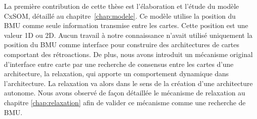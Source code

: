La première contribution de cette thèse est l'élaboration et l'étude du modèle CxSOM, détaillé au chapitre~\ref{chap:modele}.
Ce modèle utilise la position du BMU comme seule information transmise entre les cartes. Cette position est une valeur 1D ou 2D. Aucun travail à notre connaissance n'avait utilisé uniquement la position du BMU comme interface pour construire des architectures de cartes comportant des rétroactions.
De plus, nous avons introduit un mécanisme original d'interface entre carte par une recherche de consensus entre les cartes d'une architecture, la relaxation, qui apporte un comportement dynamique dans l'architecture.
La relaxation va alors dans le sens de la création d'une architecture autonome.
Nous avons observé de façon détaillée le mécanisme de relaxation au chapitre \ref{chap:relaxation} afin de valider ce mécanisme comme une recherche de BMU.


